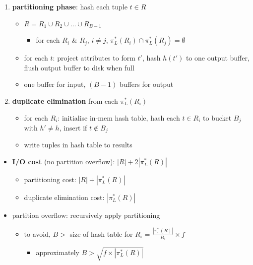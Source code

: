 \documentclass[8pt, landscape]{extarticle}
\begin{document}
\begin{multicols*}{4}
  \begin{enumerate}
    \item \textbf{partitioning phase}: hash each tuple $t \in R$ 
      \begin{itemize}
        \item $R = R_1 \cup R_2 \cup \dots \cup R_{B-1}$
          \begin{itemize}
            \item for each $R_i$ \& $R_j$, $i \neq j$, $\pi_L^*(R_i) \cap \pi_L^*(R_j) = \emptyset$
          \end{itemize}
        \item for each $t$: project attributes to form $t'$, hash $h(t')$ to one output buffer, flush output buffer to disk when full
        \item one buffer for input, $(B-1)$ buffers for output
      \end{itemize}
    \item \textbf{duplicate elimination} from each $\pi^*_L(R_i)$
      \begin{itemize}
        \item for each $R_i$: initialise in-mem hash table, hash each $t \in R_i$ to bucket $B_j$ with $h' \neq h$, insert if $t \not\in B_j$
        \item write tuples in hash table to results
      \end{itemize}
  \end{enumerate}

  \begin{itemize}
    \item \textbf{I/O cost} (no partition overflow): $|R| + 2|\pi^*_L(R)|$
      \begin{itemize}
        \item partitioning cost: $|R| + |\pi^*_L(R)|$
        \item duplicate elimination cost: $|\pi^*_L(R)|$
      \end{itemize}
    \item partition overflow: recursively apply partitioning
      \begin{itemize}
        \item to avoid, $B>$ size of hash table for $R_i$ = $\frac{|\pi^*_L(R)|}{B_1} \times f$
          \begin{itemize}
            \item  approximately $B> \sqrt{f\times |\pi^*_L(R)|}$
          \end{itemize}
      \end{itemize}
  \end{itemize}


\end{multicols*}
\end{document}
